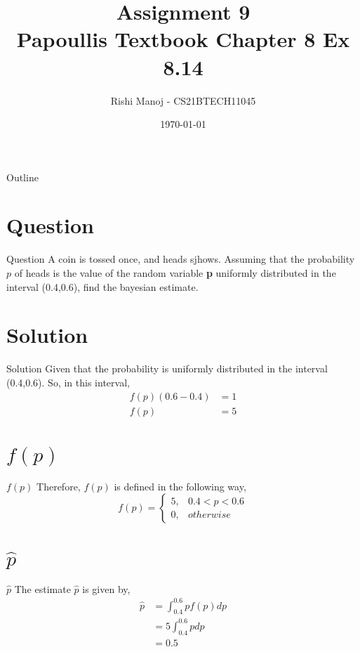 \documentclass{beamer}
\title{Assignment 9 \\ Papoullis Textbook Chapter 8 Ex 8.14}
\author{Rishi Manoj - CS21BTECH11045}
\date{\today}
\begin{document}
\begin{frame}
    \titlepage 
\end{frame}

\logo{}


\begin{frame}{Outline}
    \tableofcontents
\end{frame}


\section{Question}
\begin{frame}{Question}
A coin is tossed once, and heads sjhows. Assuming that the probability $p$ of heads is the value of the random variable \textbf{p} uniformly distributed in the interval (0.4,0.6), find the bayesian estimate.
\end{frame}


\section{Solution}
\begin{frame}{Solution}
Given that the probability is uniformly distributed in the interval (0.4,0.6). So, in this interval,
	\begin{align}
	          f(p)(0.6-0.4) &= 1 \\
	          f(p) &= 5
    \end{align}
\end{frame}


\section{$f(p)$}
\begin{frame}{$f(p)$}
Therefore, $f(p)$ is defined in the following way,
    \begin{equation*}
           f(p)  = \begin{cases}
                    5,  & 0.4<p<0.6 \\
                    0,  & otherwise
                   \end{cases}
    \end{equation*}
\end{frame}


\section{$\hat{p}$}
\begin{frame}{$\hat{p}$}
The estimate $\hat{p}$ is given by,
    \begin{align}
           \hat{p} &= \int_{0.4}^{0.6} pf(p)dp \\
                   &= 5\int_{0.4}^{0.6} pdp \\
                   &= 0.5
    \end{align} 
\end{frame}
\end{document}
